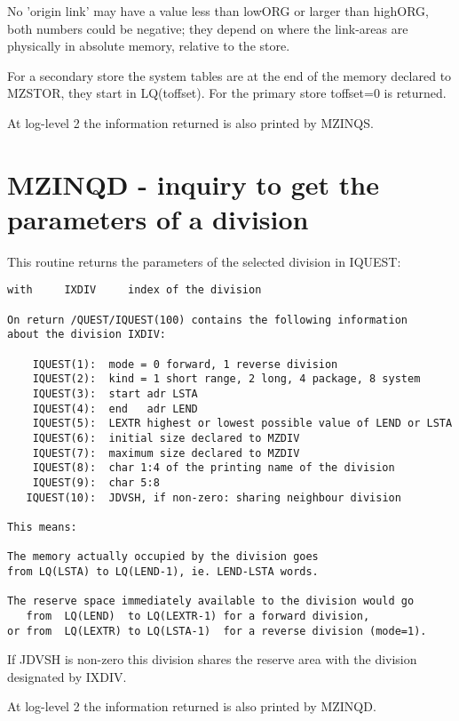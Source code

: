 No 'origin link' may have a value less than lowORG or larger than highORG,
both numbers could be negative; they depend on where the link-areas are
physically in absolute memory, relative to the store.

For a secondary store the system tables are at the end of
the memory declared to MZSTOR, they start in LQ(toffset).
For the primary store toffset=0 is returned.

At log-level 2 the information returned is also printed by MZINQS.

\section{MZINQD - inquiry to get the parameters of a division}

This routine returns the parameters of the selected division in IQUEST:


\begin{verbatim}
with     IXDIV     index of the division

On return /QUEST/IQUEST(100) contains the following information
about the division IXDIV:

    IQUEST(1):  mode = 0 forward, 1 reverse division
    IQUEST(2):  kind = 1 short range, 2 long, 4 package, 8 system
    IQUEST(3):  start adr LSTA
    IQUEST(4):  end   adr LEND
    IQUEST(5):  LEXTR highest or lowest possible value of LEND or LSTA
    IQUEST(6):  initial size declared to MZDIV
    IQUEST(7):  maximum size declared to MZDIV
    IQUEST(8):  char 1:4 of the printing name of the division
    IQUEST(9):  char 5:8
   IQUEST(10):  JDVSH, if non-zero: sharing neighbour division

This means:

The memory actually occupied by the division goes
from LQ(LSTA) to LQ(LEND-1), ie. LEND-LSTA words.

The reserve space immediately available to the division would go
   from  LQ(LEND)  to LQ(LEXTR-1) for a forward division,
or from  LQ(LEXTR) to LQ(LSTA-1)  for a reverse division (mode=1).
\end{verbatim} 

If JDVSH is non-zero this division shares the reserve area with
the division designated by IXDIV.

At log-level 2 the information returned is also printed by MZINQD.

